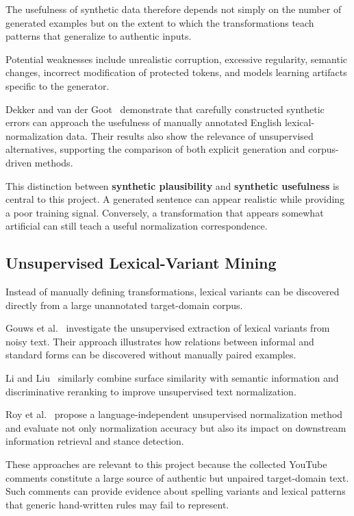 \documentclass[12pt, a4paper, twoside, openany]{report}
\begin{document}
The usefulness of synthetic data therefore depends not simply on the number of generated examples but on the extent to which the transformations teach patterns that generalize to authentic inputs.

Potential weaknesses include unrealistic corruption, excessive regularity, semantic changes, incorrect modification of protected tokens, and models learning artifacts specific to the generator.

Dekker and van der Goot~\cite{dekker2020synthetic} demonstrate that carefully constructed synthetic errors can approach the usefulness of manually annotated English lexical-normalization data. Their results also show the relevance of unsupervised alternatives, supporting the comparison of both explicit generation and corpus-driven methods.

This distinction between \textbf{synthetic plausibility} and \textbf{synthetic usefulness} is central to this project. A generated sentence can appear realistic while providing a poor training signal. Conversely, a transformation that appears somewhat artificial can still teach a useful normalization correspondence.


\subsection{Unsupervised Lexical-Variant Mining}

Instead of manually defining transformations, lexical variants can be discovered directly from a large unannotated target-domain corpus.

Gouws et al.~\cite{gouws2011lexical} investigate the unsupervised extraction of lexical variants from noisy text. Their approach illustrates how relations between informal and standard forms can be discovered without manually paired examples.

Li and Liu~\cite{li2014normalization} similarly combine surface similarity with semantic information and discriminative reranking to improve unsupervised text normalization.

Roy et al.~\cite{roy2021normalization} propose a language-independent unsupervised normalization method and evaluate not only normalization accuracy but also its impact on downstream information retrieval and stance detection.

These approaches are relevant to this project because the collected YouTube comments constitute a large source of authentic but unpaired target-domain text. Such comments can provide evidence about spelling variants and lexical patterns that generic hand-written rules may fail to represent.
\end{document}

